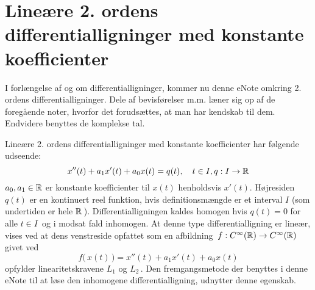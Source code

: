 
\setcounter{chapter}{12} %


\chapter[Lineære 2. ordens differentialligninger]{Lineære 2. ordens differentialligninger med konstante koefficienter} \label{tn13}

\begin{basis}
I forlængelse af  og  om differentialligninger, kommer nu denne eNote omkring 2. ordens differentialligninger. Dele af bevisførelser m.m. læner sig op af de foregående noter, hvorfor det forudsættes, at man har kendskab til dem. Endvidere benyttes de komplekse tal.
\end{basis}

Lineære 2. ordens differentialligninger med konstante koefficienter har følgende udseende:
\begin{equation}
x''(t) + a_1x'(t) + a_0x(t) = q(t), \quad t \in I, q : I \rightarrow \mathbb{R}
\end{equation}
$ a_0, a_1 \in \mathbb{R} $ er konstante koefficienter til $ x(t) $ henholdsvis $ x'(t) $. Højresiden $ q(t) $ er en kontinuert reel funktion, hvis definitionsmængde er et interval $I$ (som undertiden er hele $\mathbb{R}\,$). Differentialligningen kaldes homogen hvis $q(t)=0$ for alle $t\in I\,$ og i modsat fald inhomogen.\bs 
At denne type differentialligning er lineær, vises ved at dens venstreside opfattet som en afbildning $\,f:C^{\infty}(\mathbb{R})\rightarrow C^{\infty}(\mathbb{R})\,$ givet ved
\begin{equation}
f\big(\,x(t)\,)=x''(t)+a_1x'(t)+a_0x(t)
\end{equation}
opfylder linearitetskravene $L_1$ og $L_2\,$. Den fremgangsmetode der benyttes i denne eNote til at løse den inhomogene differentialligning, udnytter denne egenskab.

